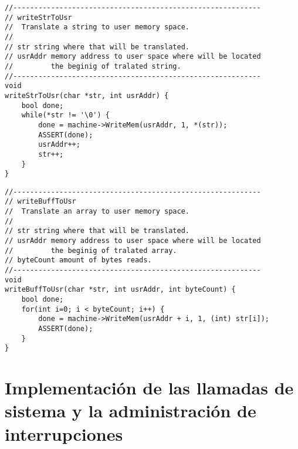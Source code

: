 \begin{lstlisting}[style=C]
//-----------------------------------------------------------
// writeStrToUsr
//  Translate a string to user memory space.
//
// str string where that will be translated.
// usrAddr memory address to user space where will be located
//         the beginig of tralated string.
//-----------------------------------------------------------
void
writeStrToUsr(char *str, int usrAddr) {
    bool done;
    while(*str != '\0') {
        done = machine->WriteMem(usrAddr, 1, *(str));
        ASSERT(done);
        usrAddr++;
        str++;
    }
}
\end{lstlisting}
\begin{lstlisting}[style=C]
//-----------------------------------------------------------
// writeBuffToUsr
//  Translate an array to user memory space.
//
// str string where that will be translated.
// usrAddr memory address to user space where will be located
//         the beginig of tralated array.
// byteCount amount of bytes reads.
//-----------------------------------------------------------
void
writeBuffToUsr(char *str, int usrAddr, int byteCount) {
    bool done;
    for(int i=0; i < byteCount; i++) {
        done = machine->WriteMem(usrAddr + i, 1, (int) str[i]);
        ASSERT(done);
    }
}
\end{lstlisting}
\section{Implementación de las llamadas de sistema y la administración de interrupciones}

\section{}
\section{}
\section{}